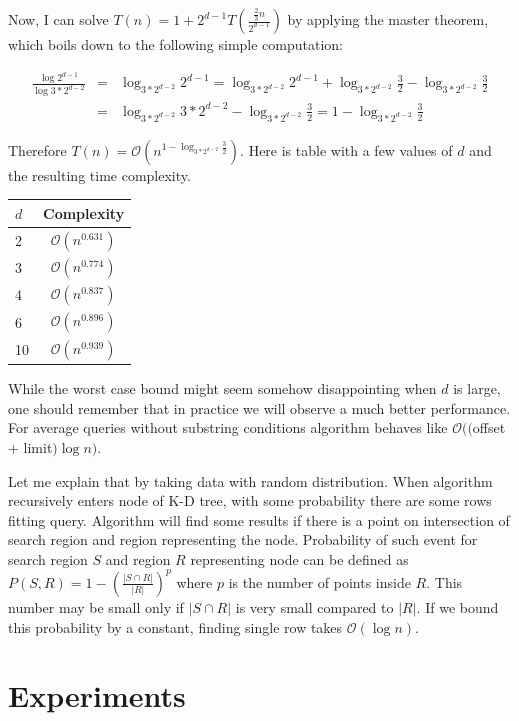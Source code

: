 \documentclass[10pt,a4paper]{article}
\newcommand{\Oh}{\mathcal{O}}
\begin{document}
Now, I can solve $T(n)=1+2^{d-1}T(\frac{\frac{2}{3}n}{2^{d-1}})$ by applying the master theorem, which boils down to the following simple computation:

\begin{eqnarray*}
\frac{\log 2^{d-1}}{\log 3*2^{d-2}} &=& \log_{3*2^{d-2}}{2^{d-1}} = \log_{3*2^{d-2}}{2^{d-1}} + \log_{3*2^{d-2}}{\frac{3}{2}} - \log_{3*2^{d-2}}{\frac{3}{2}}\\ 
&=& \log_{3*2^{d-2}}{3*2^{d-2}} - \log_{3*2^{d-2}}{\frac{3}{2}} = 1 - \log_{3*2^{d-2}}{\frac{3}{2}}
\end{eqnarray*}


Therefore $T(n) = \Oh(n^{1 - \log_{3*2^{d-2}}{\frac{3}{2}}})$.
Here is table with a few values of $d$ and the resulting time complexity.

\begin{center}
\begin{tabular}{|l|c|}
\hline $d$ & Complexity \\
\hline 2 & $\Oh(n^{0.631})$ \\
\hline 3 & $\Oh(n^{0.774})$  \\
\hline 4 & $\Oh(n^{0.837})$ \\
\hline 6 & $\Oh(n^{0.896})$ \\
\hline 10 & $\Oh(n^{0.939})$ \\
\hline 
\end{tabular}
\end{center}

While the worst case bound might seem somehow disappointing when $d$ is large, one should remember that in practice we will observe a much better performance. For average queries without substring conditions algorithm behaves like $\Oh(($offset + limit$) \log n)$.

Let me explain that by taking data with random distribution. When algorithm recursively enters node of K-D tree, with some probability there are some rows fitting query. Algorithm will find some results if there is a point on intersection of search region and region representing the node. Probability of such event for search region $S$ and region $R$ representing node can be defined as $P(S, R) = 1 - (\frac{|S \cap R|}{|R|})^p$ where $p$ is the number of points inside $R$. This number may be small only if $|S \cap R|$ is very small compared to $|R|$. If we bound this probability by a constant, finding single row takes $\Oh(\log n)$.

\section{Experiments}
\label{chapter:tests}
\end{document}
